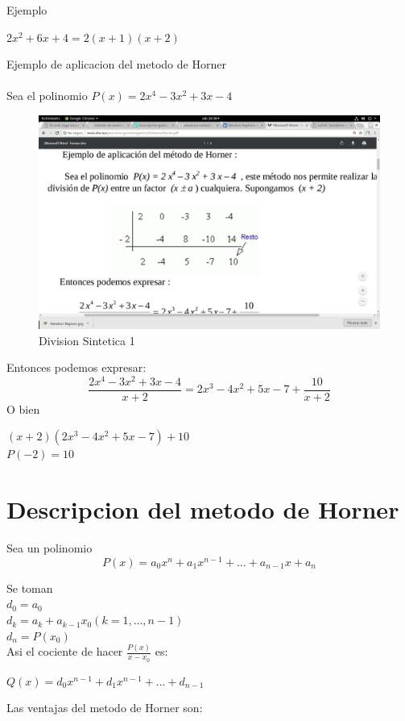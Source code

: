 \documentclass{article}
\begin{document}
\begin{multicols}{2}
Ejemplo
\\
\begin{center}
$2x^{2}+6x+4=2(x+1)(x+2)$
\end{center}
Ejemplo de aplicacion del metodo de Horner
\\
\\
Sea el polinomio $P(x)=2x^{4}-3x^{2}+3x-4$
\begin{figure}[H]
\centering
\includegraphics[scale=.25, %
trim=250 250 500 350,clip]{DivisionSintetica.png}
\caption{Division Sintetica 1}
\end{figure}

Entonces podemos expresar:
\begin{equation}
\frac{2x^{4}-3x^{2}+3x-4}{x+2} = 2x^{3}-4x^{2}+5x-7+\frac{10}{x+2}
\end{equation}
O bien
\begin{center}
$(x+2)(2x^{3}-4x^{2}+5x-7)+10$
\\
$P(-2)=10$
\end{center}




\section{Descripcion del metodo de Horner}
\label{sec:Des}
Sea un polinomio 
\begin{equation}
P(x)=a_{0}x^{n}+a_{1}x^{n-1}+...+a_{n-1}x+a_{n}
\end{equation}

Se toman 
\\
$d_{0}=a_{0}$
\\
$d_{k}=a_{k}+a_{k-1}x_{0}(k=1,...,n-1)$
\\
$d_{n}=P(x_{0})$
\\
Asi el cociente de hacer  $\frac{P(x)}{x-x_{0}}$ es:
\\
\begin{center}
$Q(x)=d_{0}x^{n-1}+d_{1}x^{n-1}+...+d_{n-1}$
\end{center}
Las ventajas del metodo de Horner son:


\end{multicols}
\end{document}
